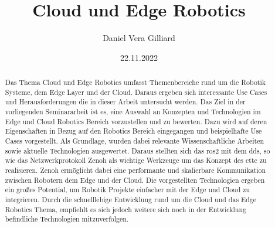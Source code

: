 \documentclass[runningheads]{llncs}
\begin{document}
\mainmatter
\title{Cloud und Edge Robotics}
\author{Daniel Vera Gilliard}
\date{22.11.2022}
\maketitle


\begin{abstract}
  Das Thema Cloud und Edge Robotics umfasst Themenbereiche rund um die Robotik Systeme, dem Edge Layer und der Cloud. Daraus ergeben sich interessante Use Cases und Herausforderungen die in dieser Arbeit untersucht werden. Das Ziel in der vorliegenden Seminararbeit ist es, eine Auswahl an Konzepten und Technologien im Edge und Cloud Robotics Bereich vorzustellen und zu bewerten. Dazu wird auf deren Eigenschaften in Bezug auf den Robotics Bereich eingegangen und beispielhafte Use Cases vorgestellt. Als Grundlage, wurden dabei relevante Wissenschaftliche Arbeiten sowie aktuelle Technologien ausgewertet. Daraus stellten sich das \acrfull{ros2} mit dem \acrfull{dds}, so wie das Netzwerkprotokoll Zenoh als wichtige Werkzeuge um das Konzept des \acrlong{cttc} zu realisieren. Zenoh ermöglicht dabei eine performante und skalierbare Kommunikation zwischen Robotern dem Edge und der Cloud. Die vorgestellten Technologien ergeben ein großes Potential, um Robotik Projekte einfacher mit der Edge und Cloud zu integrieren. Durch die schnelllebige Entwicklung rund um die Cloud und das Edge Robotics Thema, empfiehlt es sich jedoch weitere sich noch in der Entwicklung befindliche Technologien mitzuverfolgen. 
\end{abstract}















\end{document}
